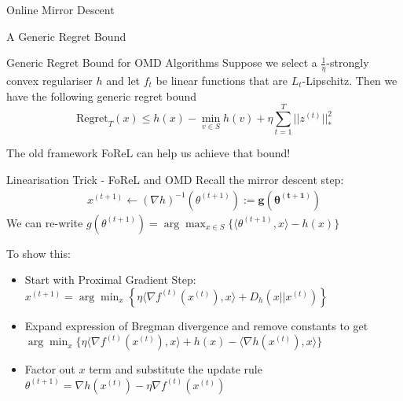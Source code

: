 \begin{frame}{Online Mirror Descent}
    \small
    \begin{center}
    \end{center}
\end{frame}

\begin{frame}{A Generic Regret Bound}
\begin{block}{Generic Regret Bound for OMD Algorithms}
Suppose we select a $\frac{1}{\eta}$-strongly convex regulariser $h$ and let $f_t$ be linear functions that are $L_t$-Lipschitz. Then we have the following generic regret bound
    \begin{equation*}
        \text{Regret}_T(x) \leq h(x) - \min_{v\in S}h(v) + \eta \sum_{t=1}^T ||z^{(t)}||_*^2
    \end{equation*}
\end{block}\pause
The old framework FoReL can help us achieve that bound!
\end{frame}

\begin{frame}{Linearisation Trick - FoReL and OMD}
    Recall the mirror descent step:
    \begin{align}
        x^{(t+1)} \gets (\nabla h)^{-1}(\theta^{(t+1)}) :=  \boldsymbol{g(\theta^{(t+1)})}
    \end{align}
    We can re-write $g(\theta^{(t+1)}) = \arg\max_{x \in S} \{\langle \theta^{(t+1)}, x\rangle - h(x)\}$ 
    
    To show this:
    \begin{itemize}
        \item Start with Proximal Gradient Step: $x^{(t+1)} = \arg \min_{x} \left\{\eta \langle \nabla f^{(t)}(x^{(t)}), x\rangle + D_h(x || x^{(t)})\right\}$
        \item Expand expression of Bregman divergence and remove constants to get $\arg\min_x \{ \eta \langle \nabla f^{(t)}(x^{(t)}), x \rangle + h(x) - \langle \nabla h(x^{(t)}), x \rangle \}$
        \item Factor out $x$ term and substitute the update rule $\theta^{(t+1)} =\nabla h(x^{(t)}) - \eta \nabla f^{(t)}(x^{(t)})$
    \end{itemize}
\end{frame}

